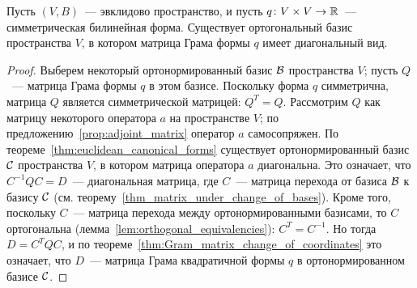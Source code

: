 \begin{corollary}
Пусть $(V,B)$~--- эвклидово пространство, и пусть
$q\colon V\times V\to \mathbb R$~--- симметрическая билинейная
форма. Существует ортогональный базис пространства $V$, в котором
матрица Грама формы $q$ имеет диагональный вид.
\end{corollary}
\begin{proof}
Выберем некоторый ортонормированный базис $\mathcal B$ пространства $V$;
пусть $Q$~--- матрица Грама формы $q$ в этом базисе.
Поскольку форма $q$ симметрична, матрица $Q$ является симметрической
матрицей: $Q^T = Q$. Рассмотрим $Q$ как матрицу некоторого оператора
$a$ на пространстве $V$; по предложению~\ref{prop:adjoint_matrix}
оператор $a$ самосопряжен.
По теореме~\ref{thm:euclidean_canonical_forms} существует
ортонормированный базис $\mathcal C$ пространства $V$, в котором матрица
оператора $a$ диагональна. Это означает, что
$C^{-1}QC = D$~--- диагональная матрица, где $C$~--- матрица перехода
от базиса $\mathcal B$ к базису $\mathcal C$
(см. теорему~\ref{thm_matrix_under_change_of_bases}). Кроме того,
поскольку $C$~--- матрица перехода между ортонормированными базисами,
то $C$ ортогональна (лемма~\ref{lem:orthogonal_equivalencies}): $C^T =
C^{-1}$. Но тогда
$D = C^TQC$, и по теореме~\ref{thm:Gram_matrix_change_of_coordinates}
это означает, что $D$~--- матрица Грама
квадратичной формы $q$ в ортонормированном базисе $\mathcal C$.
\end{proof}

